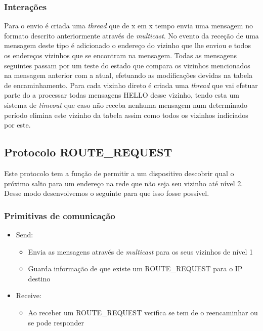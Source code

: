 \documentclass{llncs}
\begin{document}
\subsubsection{Interações}

Para o envio é criada uma \emph{thread} que de x em x tempo envia uma mensagem no formato descrito anteriormente através de \emph{multicast}.
No evento da receção de uma mensagem deste tipo é adicionado o endereço do vizinho que lhe enviou e todos os endereços vizinhos que se encontram na mensagem. Todas as mensagens seguintes passam por um teste do estado que compara os vizinhos mencionados na mensagem anterior com a atual, efetuando as modificações devidas na tabela de encaminhamento. Para cada vizinho direto é  criada uma \emph{thread} que vai efetuar parte do  a processar todas mensagens HELLO desse vizinho, tendo esta um sistema de \emph{timeout} que caso não receba nenhuma mensagem num determinado período elimina este vizinho da tabela assim como todos os vizinhos indiciados por este.


\subsection{Protocolo ROUTE\_REQUEST}

Este protocolo tem a função de permitir a um dispositivo descobrir qual o próximo salto para um endereço na rede que não seja seu vizinho até nível 2. Desse modo desenvolvemos o seguinte para que isso fosse possível.

\subsubsection{Primitivas de comunicação}

\begin{itemize}
    \item Send: \begin{itemize}
        \item Envia as mensagens através de \emph{multicast} para os seus vizinhos de nível 1
        \item Guarda informação de que existe um ROUTE\_REQUEST para o IP destino
    \end{itemize}
    \item Receive: \begin{itemize}
        \item Ao receber um ROUTE\_REQUEST verifica se tem de o reencaminhar ou se pode responder
    \end{itemize}
\end{itemize}
\end{document}
